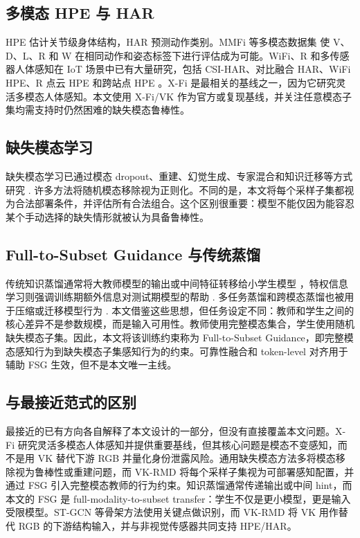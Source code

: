 ﻿\documentclass[UTF8,twocolumn]{ctexart}
\newcommand{\method}{VK-RMD}
\begin{document}
\subsection{多模态 HPE 与 HAR}
HPE 估计关节级身体结构，HAR 预测动作类别。MMFi 等多模态数据集 \cite{mmfi,mmfi_arxiv} 使 V、D、L、R 和 W 在相同动作和姿态标签下进行评估成为可能。WiFi、R 和多传感器人体感知在 IoT 场景中已有大量研究，包括 CSI-HAR、对比融合 HAR、WiFi HPE、R 点云 HPE 和跨站点 HPE \cite{lightweight_csi_iotj,multimodal_cf_iotj,metafi_iotj,robust_wifi_pose_iotj,virteach_iotj,adapose_iotj}。X-Fi \cite{xfi} 是最相关的基线之一，因为它研究灵活多模态人体感知。本文使用 X-Fi/VK 作为官方或复现基线，并关注任意模态子集均需支持时仍然困难的缺失模态鲁棒性。

\subsection{缺失模态学习}
缺失模态学习已通过模态 dropout、重建、幻觉生成、专家混合和知识迁移等方式研究 \cite{missing,ma_missing_survey,neverova_moddrop,tsai_multimodal_transformer}. 许多方法将随机模态移除视为正则化。不同的是，本文将每个采样子集都视为合法部署条件，并评估所有合法组合。这个区别很重要：模型不能仅因为能容忍某个手动选择的缺失情形就被认为具备鲁棒性。

\subsection{Full-to-Subset Guidance 与传统蒸馏}
传统知识蒸馏通常将大教师模型的输出或中间特征转移给小学生模型 \cite{hinton2015,fitnets,gou_kd_survey}，特权信息学习则强调训练期额外信息对测试期模型的帮助 \cite{vapnik2009}. 多任务蒸馏和跨模态蒸馏也被用于压缩或迁移模型行为 \cite{multitask_kd,gupta_cross_modal}. 本文借鉴这些思想，但任务设定不同：教师和学生之间的核心差异不是参数规模，而是输入可用性。教师使用完整模态集合，学生使用随机缺失模态子集。因此，本文将该训练约束称为 Full-to-Subset Guidance，即完整模态感知行为到缺失模态子集感知行为的约束。可靠性融合和 token-level 对齐用于辅助 FSG 生效，但不是本文唯一主线。

\subsection{与最接近范式的区别}
最接近的已有方向各自解释了本文设计的一部分，但没有直接覆盖本文问题。X-Fi 研究灵活多模态人体感知并提供重要基线，但其核心问题是模态不变感知，而不是用 VK 替代下游 RGB 并量化身份泄露风险。通用缺失模态方法多将模态移除视为鲁棒性或重建问题，而 \method{} 将每个采样子集视为可部署感知配置，并通过 FSG 引入完整模态教师的行为约束。知识蒸馏通常传递输出或中间 hint，而本文的 FSG 是 full-modality-to-subset transfer：学生不仅是更小模型，更是输入受限模型。ST-GCN 等骨架方法使用关键点做识别，而 \method{} 将 VK 用作替代 RGB 的下游结构输入，并与非视觉传感器共同支持 HPE/HAR。
\end{document}
